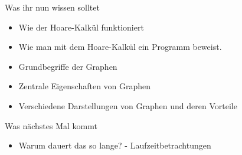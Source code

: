\begin{frame}	
	\begin{block}{Was ihr nun wissen solltet}
		\begin{itemize}
			\item Wie der Hoare-Kalkül funktioniert
			\item Wie man mit dem Hoare-Kalkül ein Programm beweist.
			
			\item Grundbegriffe der Graphen
			\item Zentrale Eigenschaften von Graphen
			\item Verschiedene Darstellungen von Graphen und deren Vorteile
		\end{itemize}
	\end{block}
	
	\begin{block}{Was nächstes Mal kommt}
		\begin{itemize}
			\item Warum dauert das so lange? - Laufzeitbetrachtungen
		\end{itemize}
	\end{block}
\end{frame}


\slideThanks

